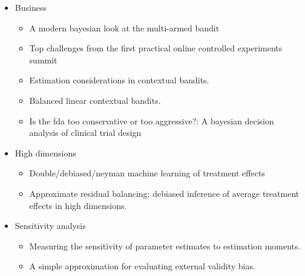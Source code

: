 \documentclass[12pt]{article}
\theoremstyle{plain}
\theoremstyle{definition}
\theoremstyle{remark}
\begin{document}
\begin{itemize}
  \item Business
    \begin{itemize}
      \item A modern bayesian look at the multi-armed bandit
      \item
        Top challenges from the first practical
        online controlled experiments summit
      \item Estimation considerations in contextual
        bandits.
      \item Balanced linear contextual bandits.
      \item Is the fda too conservative or too
        aggressive?: A bayesian decision analysis of clinical trial
        design
    \end{itemize}


  \item High dimensions
    \begin{itemize}
      \item Double/debiased/neyman machine learning of treatment effects
      \item Approximate residual balancing: debiased
        inference of average treatment effects in high dimensions.
    \end{itemize}

  \item
    Sensitivity analysis
    \begin{itemize}
      \item  Measuring the sensitivity of parameter estimates to
        estimation moments.
      \item A simple approximation for evaluating external validity
        bias.
    \end{itemize}
\end{itemize}
\end{document}
